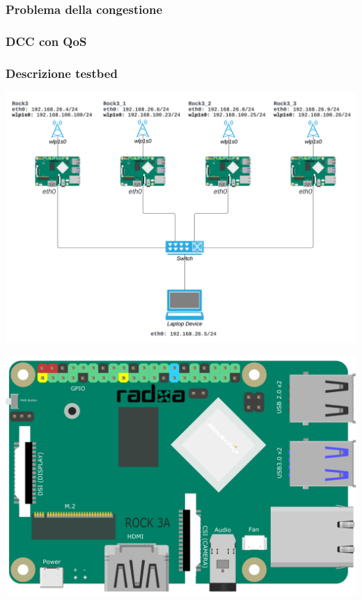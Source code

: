 \documentclass{beamer}
\begin{document}
\begin{frame}
    \frametitle{Problema della congestione}
\end{frame}

\begin{frame}
    \frametitle{DCC con QoS}
\end{frame}

\begin{frame}
    \frametitle{Descrizione testbed}
    \centering
    \begin{minipage}{0.6\textwidth}
        \includegraphics[width=\textwidth]{topology.png} %
    \end{minipage}
    \hfill
    \begin{minipage}{0.35\textwidth}
        \centering
        \includegraphics[width=\textwidth]{ROCK_3A.png} %

\end{minipage}
\end{frame}
\end{document}
